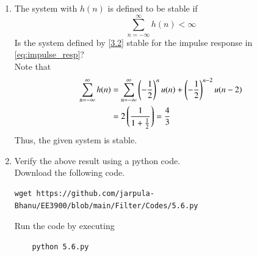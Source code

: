 \documentclass[journal,12pt,twocolumn]{IEEEtran}
\renewcommand\thesection{\arabic{section}}
\begin{document}
\begin{enumerate}[label=\thesection.\arabic*
,ref=\thesection.\theenumi]
Therefore, $h(n)$ is convergent which implies that it is bounded.
\item The system with $h(n)$ is defined to be stable if
\begin{equation}
\sum_{n=-\infty}^{\infty}h(n) < \infty
\end{equation}
Is the system defined by \eqref{3.2} stable for the impulse response in \eqref{eq:impulse_resp}?\\
%
\solution Note that
\begin{align}
	\sum_{n=-\infty}^\infty h(n) &= \sum_{n=-\infty}^\infty \left(-\frac{1}{2}\right)^nu(n)+\left(-\frac{1}{2}\right)^{n-2}u(n-2)\\
	&= 2\left(\frac{1}{1+\frac{1}{2}}\right) = \frac{4}{3}
\end{align}
Thus, the given system is stable.
\item Verify the above result using a python code.\\
\solution Download the following code.
\begin{lstlisting}
wget https://github.com/jarpula-Bhanu/EE3900/blob/main/Filter/Codes/5.6.py
\end{lstlisting}

Run the code by executing
\begin{lstlisting}
	python 5.6.py
\end{lstlisting}


\end{enumerate}
\end{document}
